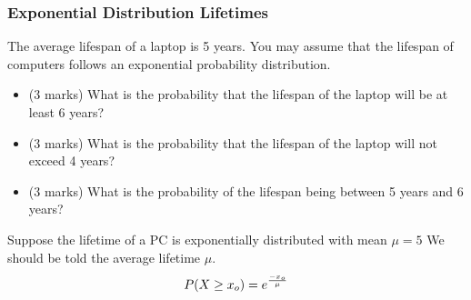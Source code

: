 



\begin{frame}
\frametitle{Exponential Distribution Lifetimes}
The average lifespan of a laptop is 5 years. You may assume that
the lifespan of computers follows an exponential probability
distribution. \begin{itemize}\item (3 marks) What is the
probability that the lifespan of the laptop will be at least 6
years? \item (3 marks)
What is the probability that the lifespan of the laptop will not
exceed 4 years? \item(3 marks) What is the probability of the
lifespan being between 5 years and 6 years?
\end{itemize}
Suppose the lifetime of a PC is exponentially distributed with
mean $\mu =5$
We should be told the average lifetime $\mu$.
\[
P( X \geq x_o) = e^{{-x_o \over \mu}}
\]
\end{frame}
